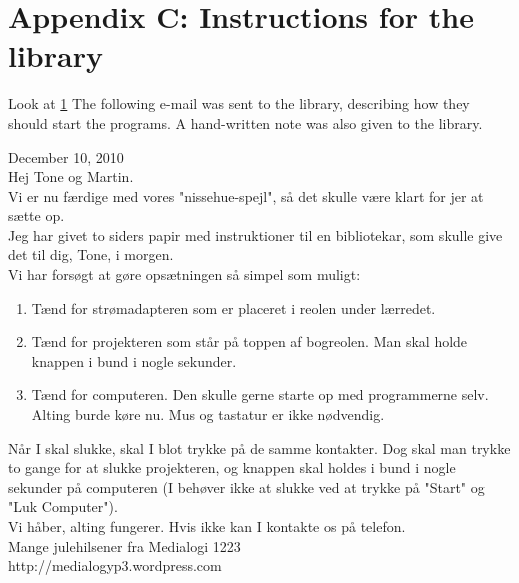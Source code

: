 \section{Appendix C: Instructions for the library}\label{email}
Look at \ref{email}
The following e-mail was sent to the library, describing how they should start the programs. A hand-written note was also given to the library.

\begin{fancyquotes}
December 10, 2010\\
Hej Tone og Martin.\\

Vi er nu f{\ae}rdige med vores "nissehue-spejl", s{\aa} det skulle v{\ae}re klart for jer at s{\ae}tte op.\\

Jeg har givet to siders papir med instruktioner til en bibliotekar, som skulle give det til dig, Tone, i morgen.\\

Vi har fors{\o}gt at g{\o}re ops{\ae}tningen s{\aa} simpel som muligt:\\

\begin{enumerate}
\item T{\ae}nd for str{\o}madapteren som er placeret i reolen under l{\ae}rredet.
\item T{\ae}nd for projekteren som st{\aa}r p{\aa} toppen af bogreolen. Man skal holde knappen i bund i nogle sekunder.
\item T{\ae}nd for computeren. Den skulle gerne starte op med programmerne selv. Alting burde k{\o}re nu. Mus og tastatur er ikke n{\o}dvendig.
\end{enumerate}

N{\aa}r I skal slukke, skal I blot trykke p{\aa} de samme kontakter. Dog skal man trykke to gange for at slukke projekteren, og knappen skal holdes i bund i nogle sekunder p{\aa} computeren (I beh{\o}ver ikke at slukke ved at trykke p{\aa} "Start" og "Luk Computer").\\

Vi h{\aa}ber, alting fungerer. Hvis ikke kan I kontakte os p{\aa} telefon.\\

Mange julehilsener fra Medialogi 1223\\
http://medialogyp3.wordpress.com\end{fancyquotes}
